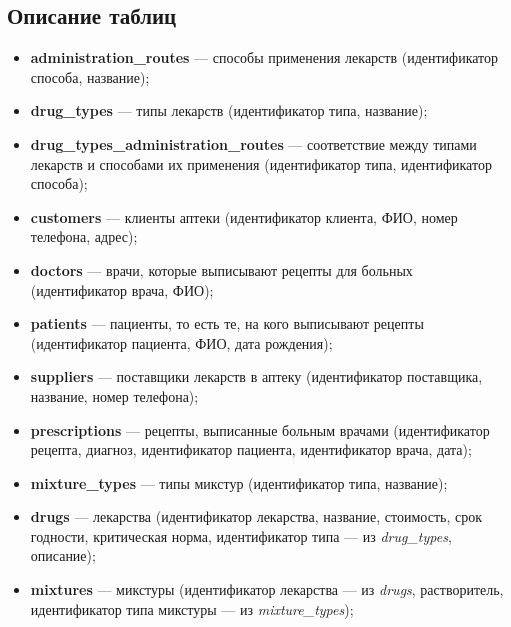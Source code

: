 \documentclass[a4paper]{article}
\newcommand{\dbtable}[1]{\textbf{#1}}
\newcommand{\dbtableref}[1]{\textit{#1}}
\begin{document}
		\subsection{Описание таблиц}
			\begin{itemize}
				\item \dbtable{administration\_routes} --- способы применения лекарств (идентификатор способа, название);
					
				\item \dbtable{drug\_types} --- типы лекарств (идентификатор типа, название);
					
				\item \dbtable{drug\_types\_administration\_routes} --- соответствие между типами лекарств и способами их применения (идентификатор типа, идентификатор способа);
					
				\item \dbtable{customers} --- клиенты аптеки (идентификатор клиента, ФИО, номер телефона, адрес);
					
				\item \dbtable{doctors} --- врачи, которые выписывают рецепты для больных (идентификатор врача, ФИО);
					
				\item \dbtable{patients} --- пациенты, то есть те, на кого выписывают рецепты (идентификатор пациента, ФИО, дата рождения);
					
				\item \dbtable{suppliers} --- поставщики лекарств в аптеку (идентификатор поставщика, название, номер телефона);
					
				\item \dbtable{prescriptions} --- рецепты, выписанные больным врачами (идентификатор рецепта, диагноз, идентификатор пациента, идентификатор врача, дата);
					
				\item \dbtable{mixture\_types} --- типы микстур (идентификатор типа, название);
					
				\item \dbtable{drugs} --- лекарства (идентификатор лекарства, название, стоимость, срок годности, критическая норма, идентификатор типа --- из \dbtableref{drug\_types}, описание);
					
				\item \dbtable{mixtures} --- микстуры (идентификатор лекарства --- из \dbtableref{drugs}, растворитель, идентификатор типа микстуры --- из \dbtableref{mixture\_types});
					

\end{itemize}
\end{document}

